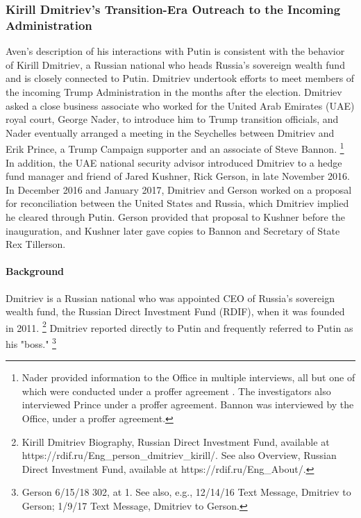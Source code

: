 \subsubsection{Kirill Dmitriev's Transition-Era Outreach to the Incoming Administration}

Aven's description of his interactions with Putin is consistent with the behavior of Kirill Dmitriev, a Russian national who heads Russia's sovereign wealth fund and is closely connected to Putin.
Dmitriev undertook efforts to meet members of the incoming Trump Administration in the months after the election.
Dmitriev asked a close business associate who worked for the United Arab Emirates (UAE) royal court, George Nader, to introduce him to Trump transition officials, and Nader eventually arranged a meeting in the Seychelles between Dmitriev and Erik Prince, a Trump Campaign supporter and an associate of Steve Bannon.%
\footnote{Nader provided information to the Office in multiple interviews, all but one of which were conducted under a proffer agreement .
The investigators also interviewed Prince under a proffer agreement.
Bannon was interviewed by the Office,  under a proffer agreement.}
In addition, the UAE national security advisor introduced Dmitriev to a hedge fund manager and friend of Jared Kushner, Rick Gerson, in late November 2016.
In December 2016 and January 2017, Dmitriev and Gerson worked on a proposal for reconciliation between the United States and Russia, which Dmitriev implied he cleared through Putin.
Gerson provided that proposal to Kushner before the inauguration, and Kushner later gave copies to Bannon and Secretary of State Rex Tillerson.

\paragraph{Background}

Dmitriev is a Russian national who was appointed CEO of Russia's sovereign wealth fund, the Russian Direct Investment Fund (RDIF), when it was founded in 2011.%
\footnote{Kirill Dmitriev Biography, Russian Direct Investment Fund, available at https://rdif.ru/Eng\_person\_dmitriev\_kirill/.
See also Overview, Russian Direct Investment Fund, available at https://rdif.ru/Eng\_About/.}
Dmitriev reported directly to Putin and frequently referred to Putin as his "boss."%
\footnote{Gerson 6/15/18 302, at 1.
See also, e.g., 12/14/16 Text Message, Dmitriev to Gerson;
1/9/17 Text Message, Dmitriev to Gerson.}

